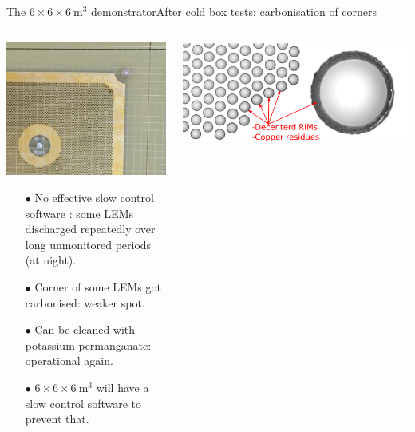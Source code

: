 \documentclass[10pt]{beamer}
\begin{document}
       \begin{frame}{The \texorpdfstring{$6 \times 6 \times \SI{6}{\meter\cubed}$}{666} demonstrator}{After cold box tests: carbonisation of corners}
	       	\begin{scriptsize}
	       		\begin{columns}
	       			\begin{column}{0.4\textwidth}
	       				\includegraphics[width=\textwidth]{figures/666/carbonisation.png}\\
	       				\vfill
	       				\begin{itemize}
	       					\item[$\bullet$] No effective slow control software : some LEMs discharged repeatedly over long unmonitored periods (at night).
	       					\item[$\bullet$] Corner of some LEMs got carbonised: weaker spot.
	       					\item[$\bullet$] Can be cleaned with potassium permanganate: operational again.
	       					\item[$\bullet$] $6 \times 6 \times \SI{6}{\meter\cubed}$ will have a slow control software to prevent that.
	       				\end{itemize}
	       			\end{column}
	       			\hfill
	       			\begin{column}{0.6\textwidth}
	       				\includegraphics[width=\textwidth]{figures/666/decentered_rims.png}\\

\end{column}
\end{columns}
\end{scriptsize}
\end{frame}
\end{document}
